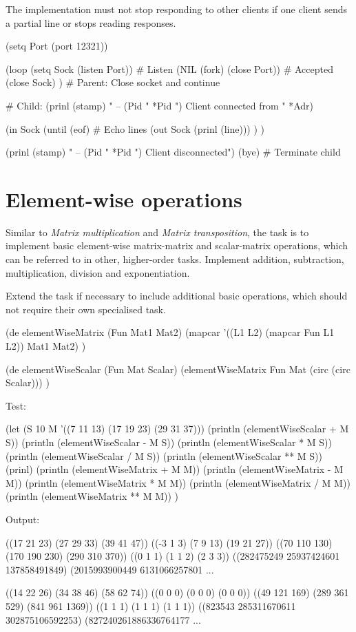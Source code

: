 The implementation must not stop responding to other clients if one
client sends a partial line or stops reading responses.



\begin{wideverbatim}

(setq Port (port 12321))

(loop
   (setq Sock (listen Port))           # Listen
   (NIL (fork) (close Port))           # Accepted
   (close Sock) )                      # Parent: Close socket and continue

# Child:
(prinl (stamp) " -- (Pid " *Pid ") Client connected from " *Adr)

(in Sock
   (until (eof)                        # Echo lines
      (out Sock (prinl (line))) ) )

(prinl (stamp) " -- (Pid " *Pid ") Client disconnected")
(bye)                                  # Terminate child

\end{wideverbatim}

\pagebreak{}
\section*{Element-wise operations}

Similar to \emph{Matrix multiplication} and \emph{Matrix
  transposition}, the task is to implement basic element-wise
matrix-matrix and scalar-matrix operations, which can be referred to
in other, higher-order tasks. Implement addition, subtraction,
multiplication, division and exponentiation.

Extend the task if necessary to include additional basic operations,
which should not require their own specialised task. 

\begin{wideverbatim}

(de elementWiseMatrix (Fun Mat1 Mat2)
   (mapcar '((L1 L2) (mapcar Fun L1 L2)) Mat1 Mat2) )

(de elementWiseScalar (Fun Mat Scalar)
   (elementWiseMatrix Fun Mat (circ (circ Scalar))) )

Test:

(let (S 10  M '((7 11 13) (17 19 23) (29 31 37)))
   (println (elementWiseScalar + M S))
   (println (elementWiseScalar - M S))
   (println (elementWiseScalar * M S))
   (println (elementWiseScalar / M S))
   (println (elementWiseScalar ** M S))
   (prinl)
   (println (elementWiseMatrix + M M))
   (println (elementWiseMatrix - M M))
   (println (elementWiseMatrix * M M))
   (println (elementWiseMatrix / M M))
   (println (elementWiseMatrix ** M M)) )

Output:

((17 21 23) (27 29 33) (39 41 47))
((-3 1 3) (7 9 13) (19 21 27))
((70 110 130) (170 190 230) (290 310 370))
((0 1 1) (1 1 2) (2 3 3))
((282475249 25937424601 137858491849) (2015993900449 6131066257801 ...

((14 22 26) (34 38 46) (58 62 74))
((0 0 0) (0 0 0) (0 0 0))
((49 121 169) (289 361 529) (841 961 1369))
((1 1 1) (1 1 1) (1 1 1))
((823543 285311670611 302875106592253) (827240261886336764177 ...

\end{wideverbatim}

